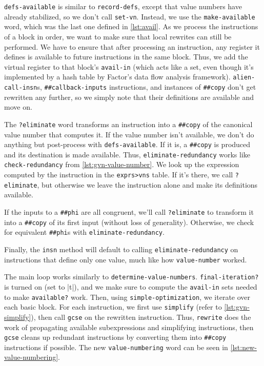 \Verb|defs-available| is similar to \Verb|record-defs|, except that value
numbers have already stabilized, so we don't call \Verb|set-vn|.  Instead, we
use the \Verb|make-available| word, which was the last one defined in
\vref{lst:avail}.  As we process the instructions of a block in order, we want
to make sure that local rewrites can still be performed.  We have to ensure
that after processing an instruction, any register it defines is available to
future instructions in the same block.  Thus, we add the virtual register to
that block's \Verb|avail-in| (which acts like a set, even though it's
implemented by a hash table by Factor's data flow analysis framework).
\Verb|alien-call-insn|s, \Verb|##callback-inputs| instructions, and
instances of \Verb|##copy| don't get rewritten any further, so we simply note
that their definitions are available and move on.

The \Verb|?eliminate| word transforms an instruction into a \Verb|##copy|
of the canonical value number that computes it.  If the value number isn't
available, we don't do anything but post-process with \Verb|defs-available|.
If it is, a \Verb|##copy| is produced and its destination is made available.
Thus, \Verb|eliminate-redundancy| works like \Verb|check-redundancy| from
\vref{lst:gvn-value-number}.  We look up the expression computed by the
instruction in the \Verb|exprs>vns| table.  If it's there, we call
\Verb|?eliminate|, but otherwise we leave the instruction alone and make its
definitions available.

If the inputs to a \Verb|##phi| are all congruent, we'll call
\Verb|?eliminate| to transform it into a \Verb|##copy| of its first input
(without loss of generality).  Otherwise, we check for equivalent
\Verb|##phi|s with \Verb|eliminate-redundancy|.

Finally, the \Verb|insn| method will default to calling
\Verb|eliminate-redundancy| on instructions that define only one value, much
like how \Verb|value-number| worked.


The main loop works similarly to \Verb|determine-value-numbers|.
\Verb|final-iteration?| is turned on (set to \factor|t|), and we make sure to
compute the \Verb|avail-in| sets needed to make \Verb|available?| work.
Then, using \Verb|simple-optimization|, we iterate over each basic block.
For each instruction, we first use \Verb|simplify| (refer to
\vref{lst:gvn-simplify}), then call \Verb|gcse| on the rewritten instruction.
Thus, \Verb|rewrite| does the work of propagating available subexpressions
and simplifying instructions, then \Verb|gcse| cleans up redundant
instructions by converting them into \Verb|##copy| instructions if possible.
The new \Verb|value-numbering| word can be seen in
\vref{lst:new-value-numbering}.

